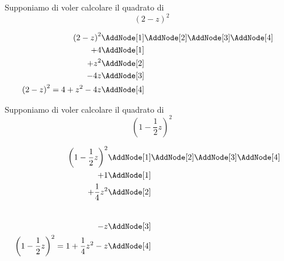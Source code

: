 \begin{esempiot}{}{}
Supponiamo di voler calcolare il quadrato di \[\left(2-z\right)^2\]
\begin{NodesList}
	\begin{align*}
		\left(2-z\right)^2&\AddNode[1]\AddNode[2]\AddNode[3]\AddNode[4]\\
		+4&\AddNode[1]&\\ 
		+z^2&\AddNode[2]&\\
		-4z&\AddNode[3]\\
		\left(2-z\right)^2=4+z^2-4z&\AddNode[4]
	\end{align*}
\end{NodesList}
\end{esempiot}
\begin{esempiot}{}{}
Supponiamo di voler calcolare il quadrato di \[\left(1-\dfrac{1}{2}z\right)^2\]
\begin{NodesList}
	\begin{align*}
		\left(1-\dfrac{1}{2}z\right)^2&\AddNode[1]\AddNode[2]\AddNode[3]\AddNode[4]\\
		+1&\AddNode[1]&\\ 
		+\dfrac{1}{4}z^2&\AddNode[2]&\\[0.8cm]
		-z&\AddNode[3]\\
		\left(1-\dfrac{1}{2}z\right)^2=1+\dfrac{1}{4}z^2-z&\AddNode[4]
	\end{align*}
\end{NodesList}
\end{esempiot}
